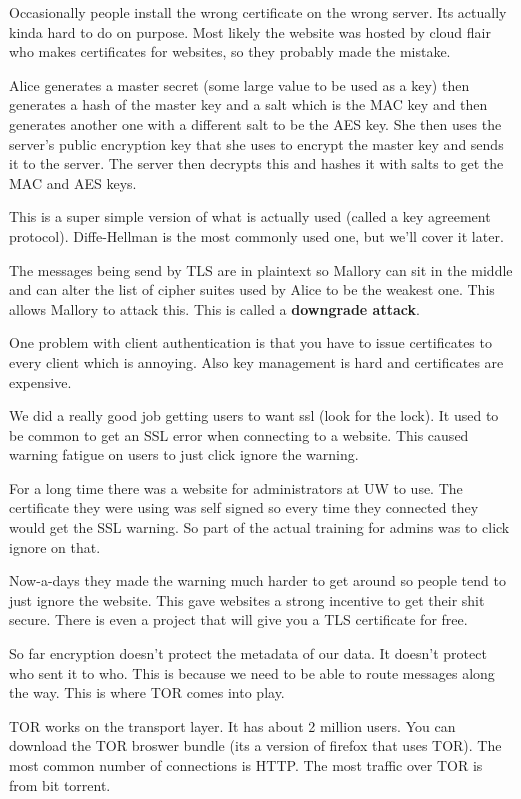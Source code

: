 \documentclass{article}
\begin{document}
Occasionally people install the wrong certificate on the wrong server. Its actually kinda hard to do on purpose. Most likely the website was hosted by cloud flair who makes certificates for websites, so they probably made the mistake.


Alice generates a master secret (some large value to be used as a key) then generates a hash of the master key and a salt which is the MAC key and then generates another one with a different salt to be the AES key. She then uses the server's public encryption key that she uses to encrypt the master key and sends it to the server. The server then decrypts this and hashes it with salts to get the MAC and AES keys. 

This is a super simple version of what is actually used (called a key agreement protocol). Diffe-Hellman is the most commonly used one, but we'll cover it later.


The messages being send by TLS are in plaintext so Mallory can sit in the middle and can alter the list of cipher suites used by Alice to be the weakest one. This allows Mallory to attack this. This is called a \textbf{downgrade attack}.

One problem with client authentication is that you have to issue certificates to every client which is annoying. Also key management is hard and certificates are expensive.


We did a really good job getting users to want ssl (look for the lock). It used to be common to get an SSL error when connecting to a website. This caused warning fatigue on users to just click ignore the warning.

For a long time there was a website for administrators at UW to use. The certificate they were using was self signed so every time they connected they would get the SSL warning. So part of the actual training for admins was to click ignore on that.

Now-a-days they made the warning much harder to get around so people tend to just ignore the website. This gave websites a strong incentive to get their shit secure. There is even a project that will give you a TLS certificate for free.


So far encryption doesn't protect the metadata of our data. It doesn't protect who sent it to who. This is because we need to be able to route messages along the way. This is where TOR comes into play.


TOR works on the transport layer. It has about 2 million users. You can download the TOR broswer bundle (its a version of firefox that uses TOR). The most common number of connections is HTTP. The most traffic over TOR is from bit torrent.




\end{document}
